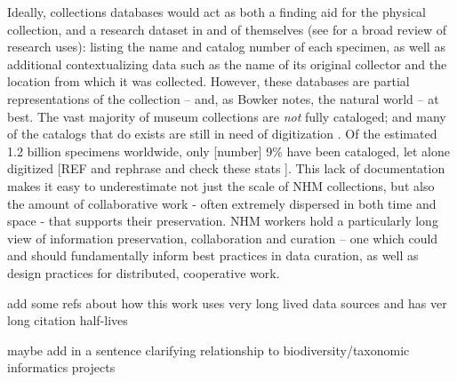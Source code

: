 Ideally, collections databases would act as both a finding aid for the physical collection, and a research dataset in and of themselves (see \cite{Chapman2005} for a broad review of research uses): listing the name and catalog number of each specimen, as well as additional contextualizing data such as the name of its original collector and the location from which it was collected. However, these databases are partial representations of the collection -- and, as Bowker notes, the natural world \cite{Bowker_2000} -- at best. The vast majority of museum collections are \textit{not} fully cataloged; and many of the catalogs that do exists are still in need of digitization \cite{Beaman_2012}. Of the estimated 1.2 billion specimens worldwide, only [number] 9\% have been cataloged, let alone digitized [REF and rephrase and check these stats \cite{Ari_o_2010}]. This lack of documentation makes it easy to underestimate not just the scale of NHM collections, but also the amount of collaborative work  - often extremely dispersed in both time and space - that supports their preservation. NHM workers hold a particularly long view of information preservation, collaboration and curation -- one which could and should fundamentally inform best practices in data curation, as well as design practices for distributed, cooperative work.

add some refs about how this work uses very long lived data sources and has ver long citation half-lives

maybe add in a sentence clarifying relationship to biodiversity/taxonomic informatics projects
